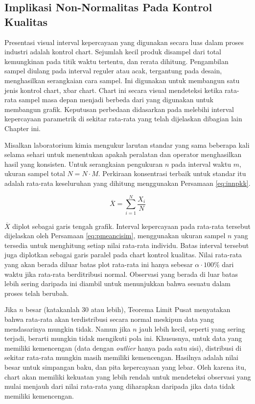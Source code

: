 \documentclass[]{book}
\begin{document}
\subsection{Implikasi Non-Normalitas Pada Kontrol
Kualitas}\label{implikasi-non-normalitas-pada-kontrol-kualitas}

Presentasi visual interval kepercayaan yang digunakan secara luas dalam
proses industri adalah kontrol chart. Sejumlah kecil produk disampel
dari total kemungkinan pada titik waktu tertentu, dan rerata dihitung.
Pengambilan sampel diulang pada interval reguler atau acak, tergantung
pada desain, menghasilkan serangkaian cara sampel. Ini digunakan untuk
membangun satu jenis kontrol chart, xbar chart. Chart ini secara visual
mendeteksi ketika rata-rata sampel masa depan menjadi berbeda dari yang
digunakan untuk membangun grafik. Keputusan perbedaan didasarkan pada
melebihi interval kepercayaan parametrik di sekitar rata-rata yang telah
dijelaskan dibagian lain Chapter ini.

Misalkan laboratorium kimia mengukur larutan standar yang sama beberapa
kali selama sehari untuk menentukan apakah peralatan dan operator
menghasilkan hasil yang konsisten. Untuk serangkaian pengukuran \(n\)
pada interval waktu \(m\), ukuran sampel total \(N=N\cdot M\). Perkiraan
konsentrasi terbaik untuk standar itu adalah rata-rata keseluruhan yang
dihitung menggunakan Persamaan \eqref{eq:innpkk}.

\begin{equation}
  \overline{X}=\sum_{i=1}^N\frac{X_i}{N}
  \label{eq:innpkk}
\end{equation}

\(\overline{X}\) diplot sebagai garis tengah grafik. Interval
kepercayaan pada rata-rata tersebut dijelaskan oleh Persamaan
\eqref{eq:pmeancisim}, menggunakan ukuran sampel \(n\) yang tersedia untuk
menghitung setiap nilai rata-rata individu. Batas interval tersebut juga
diplotkan sebagai garis paralel pada chart kontrol kualitas. Nilai
rata-rata yang akan berada diluar batas plot rata-rata ini hanya sebesar
\(\alpha\cdot100\%\) dari waktu jika rata-rata berditribusi normal.
Observasi yang berada di luar batas lebih sering daripada ini diambil
untuk menunjukkan bahwa sesuatu dalam proses telah berubah.

Jika \(n\) besar (katakanlah 30 atau lebih), Teorema Limit Pusat
menyatakan bahwa rata-rata akan terdistribusi secara normal meskipun
data yang mendasarinya mungkin tidak. Namun jika \(n\) jauh lebih kecil,
seperti yang sering terjadi, berarti mungkin tidak mengikuti pola ini.
Khususnya, untuk data yang memiliki kemencengan (data dengan
\emph{outlier} hanya pada satu sisi), distribusi di sekitar rata-rata
mungkin masih memiliki kemencengan. Hasilnya adalah nilai besar untuk
simpangan baku, dan pita kepercayaan yang lebar. Oleh karena itu, chart
akan memiliki kekuatan yang lebih rendah untuk mendeteksi observasi yang
mulai menjauh dari nilai rata-rata yang diharapkan daripada jika data
tidak memiliki kemencengan.
\end{document}
